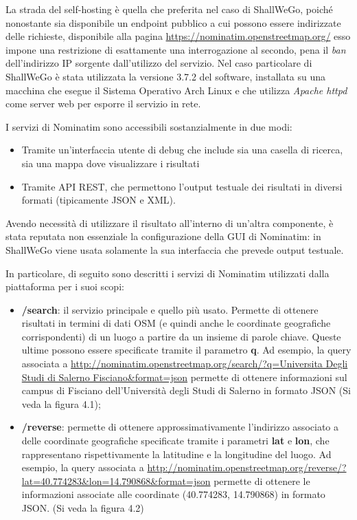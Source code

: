         La strada del self-hosting è quella che preferita nel caso di ShallWeGo, poiché nonostante sia disponibile un endpoint pubblico a cui possono essere indirizzate delle richieste, disponibile alla pagina \url{https://nominatim.openstreetmap.org/} esso impone una restrizione di esattamente una interrogazione al secondo, pena il \textit{ban} dell'indirizzo IP sorgente dall'utilizzo del servizio. 
        Nel caso particolare di ShallWeGo è stata utilizzata la versione 3.7.2 del software, installata su una macchina che esegue il Sistema Operativo Arch Linux e che utilizza \textit{Apache httpd} come server web per esporre il servizio in rete.

        I servizi di Nominatim sono accessibili sostanzialmente in due modi: 
        
        \begin{itemize}
            \item Tramite un'interfaccia utente di debug che include sia una casella di ricerca, sia una mappa dove visualizzare i risultati
            \item Tramite API REST, che permettono l'output testuale dei risultati in diversi formati (tipicamente JSON e XML).
        \end{itemize}

        Avendo necessità di utilizzare il risultato all'interno di un'altra componente, è stata reputata non essenziale la configurazione della GUI di Nominatim: in ShallWeGo viene usata solamente la sua interfaccia che prevede output testuale.

        In particolare, di seguito sono descritti i servizi di Nominatim utilizzati dalla piattaforma per i suoi scopi:

        \begin{itemize}
            \item \textbf{/search}: il servizio principale e quello più usato. Permette di ottenere risultati in termini di dati OSM (e quindi anche le coordinate geografiche corrispondenti) di un luogo a partire da un insieme di parole chiave. Queste ultime possono essere specificate tramite il parametro \textbf{q}. Ad esempio, la query associata a  \url{http://nominatim.openstreetmap.org/search/?q=Universita Degli Studi di Salerno Fisciano&format=json} permette di ottenere informazioni sul campus di Fisciano dell'Università degli Studi di Salerno in formato JSON (Si veda la figura 4.1);
            \item \textbf{/reverse}: permette di ottenere approssimativamente l'indirizzo associato a delle coordinate geografiche specificate tramite i parametri \textbf{lat} e \textbf{lon}, che rappresentano rispettivamente la latitudine e la longitudine del luogo. Ad esempio, la query associata a \url{http://nominatim.openstreetmap.org/reverse/?lat=40.774283&lon=14.790868&format=json} permette di ottenere le informazioni associate alle coordinate (40.774283, 14.790868) in formato JSON. (Si veda la figura 4.2)
        \end{itemize}

